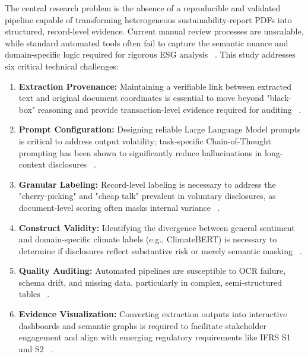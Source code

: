 \documentclass[english, online, cse, master]{dithesis}
\begin{document}
The central research problem is the absence of a reproducible and validated pipeline capable of transforming heterogeneous sustainability-report PDFs into structured, record-level evidence. Current manual review processes are unscalable, while standard automated tools often fail to capture the semantic nuance and domain-specific logic required for rigorous ESG analysis  ~\cite{p__raghavendra_rau_a32af285}. This study addresses six critical technical challenges:
\begin{enumerate}
\item 

\textbf{Extraction Provenance:} Maintaining a verifiable link between extracted text and original document coordinates is essential to move beyond "black-box" reasoning and provide transaction-level evidence required for auditing  ~\cite{steven_paul_nohr_a6874924}.\item 

\textbf{Prompt Configuration:} Designing reliable Large Language Model prompts is critical to address output volatility; task-specific Chain-of-Thought prompting has been shown to significantly reduce hallucinations in long-context disclosures  ~\cite[]{siqi_sun_c8f93141, association_for_artificial_intelligence_2026_86e12eae}.\item 

\textbf{Granular Labeling:} Record-level labeling is necessary to address the "cherry-picking" and "cheap talk" prevalent in voluntary disclosures, as document-level scoring often masks internal variance  ~\cite[]{julia_bingler_268445e3, habiba_al_shaer_c2f5394b}.\item 

\textbf{Construct Validity:} Identifying the divergence between general sentiment and domain-specific climate labels (e.g., ClimateBERT) is necessary to determine if disclosures reflect substantive risk or merely semantic masking  ~\cite[]{julia_bingler_268445e3, julia_bingler_6b484913}.\item 

\textbf{Quality Auditing:} Automated pipelines are susceptible to OCR failure, schema drift, and missing data, particularly in complex, semi-structured tables  ~\cite[]{siqi_sun_c8f93141, jacob_beck_9548a833}.\item 

\textbf{Evidence Visualization:} Converting extraction outputs into interactive dashboards and semantic graphs is required to facilitate stakeholder engagement and align with emerging regulatory requirements like IFRS S1 and S2  ~\cite{ahmad_zaki_49372c30}.
\end{enumerate}
\end{document}
